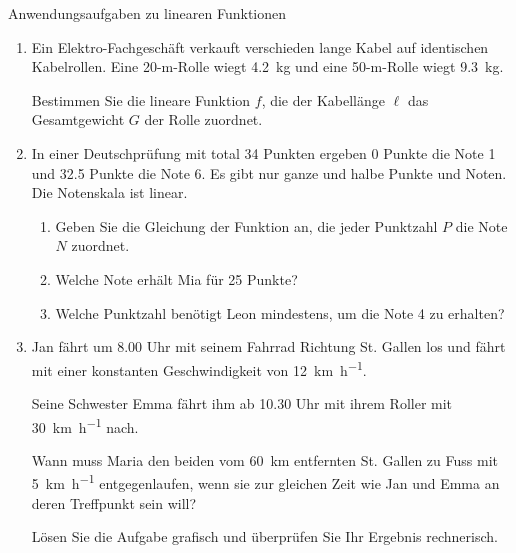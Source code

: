 \clearpage
\begin{ueb}{Anwendungsaufgaben zu linearen Funktionen}{}
    \begin{enumerate}
        \item Ein Elektro-Fachgeschäft verkauft verschieden lange Kabel
              auf identischen Kabelrollen. Eine 20-m-Rolle wiegt
              \qty{4.2}{\kilo\gram} und eine 50-m-Rolle wiegt
              \qty{9.3}{\kilo\gram}.

              Bestimmen Sie die lineare Funktion \(f\), die der
              Kabellänge \(\ell\) das Gesamtgewicht \(G\) der Rolle
              zuordnet.

        \item In einer Deutschprüfung mit total 34 Punkten ergeben
              0 Punkte die Note 1 und 32.5 Punkte die Note 6.
              Es gibt nur ganze und halbe Punkte und Noten.
              Die Notenskala ist linear.

              \begin{enumerate}
                  \item Geben Sie die Gleichung der Funktion an,
                        die jeder Punktzahl \(P\) die Note \(N\)
                        zuordnet.

                  \item Welche Note erhält Mia für 25 Punkte?

                  \item Welche Punktzahl benötigt Leon mindestens,
                        um die Note 4 zu erhalten?
              \end{enumerate}

        \item Jan fährt um 8.00 Uhr mit seinem Fahrrad Richtung
              St. Gallen los und fährt mit einer konstanten
              Geschwindigkeit von \qty{12}{\kilo\meter\per\hour}.

              Seine Schwester Emma fährt ihm ab 10.30 Uhr mit
              ihrem Roller mit \qty{30}{\kilo\meter\per\hour} nach.

              Wann muss Maria den beiden vom
              \qty{60}{\kilo\meter} entfernten St. Gallen zu Fuss
              mit \qty{5}{\kilo\meter\per\hour} entgegenlaufen,
              wenn sie zur gleichen Zeit wie Jan und Emma an
              deren Treffpunkt sein will?

              Lösen Sie die Aufgabe grafisch und überprüfen Sie
              Ihr Ergebnis rechnerisch.
    \end{enumerate}
\end{ueb}

